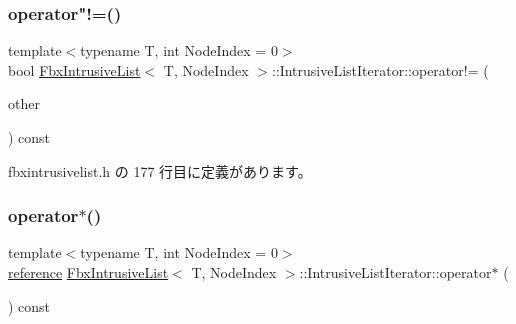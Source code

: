 \mbox{\label{class_fbx_intrusive_list_1_1_intrusive_list_iterator_a2b302e93dfb6cff66399273730d24c84}} 
\subsubsection{\texorpdfstring{operator"!=()}{operator!=()}}
{\footnotesize\ttfamily template$<$typename T, int Node\+Index = 0$>$ \\
bool \hyperlink{class_fbx_intrusive_list}{Fbx\+Intrusive\+List}$<$ T, Node\+Index $>$\+::Intrusive\+List\+Iterator\+::operator!= (\begin{DoxyParamCaption}\item[{const \hyperlink{class_fbx_intrusive_list_1_1_intrusive_list_iterator}{Intrusive\+List\+Iterator} \&}]{other }\end{DoxyParamCaption}) const\hspace{0.3cm}{\ttfamily [inline]}}



 fbxintrusivelist.\+h の 177 行目に定義があります。

\mbox{\label{class_fbx_intrusive_list_1_1_intrusive_list_iterator_aaeb3fe3d4aa1bb369c982a86874bead7}} 
\subsubsection{\texorpdfstring{operator$\ast$()}{operator*()}}
{\footnotesize\ttfamily template$<$typename T, int Node\+Index = 0$>$ \\
\hyperlink{class_fbx_intrusive_list_aa927f048081371fe74dff673d3a5a8ad}{reference} \hyperlink{class_fbx_intrusive_list}{Fbx\+Intrusive\+List}$<$ T, Node\+Index $>$\+::Intrusive\+List\+Iterator\+::operator$\ast$ (\begin{DoxyParamCaption}{ }\end{DoxyParamCaption}) const\hspace{0.3cm}{\ttfamily [inline]}}



